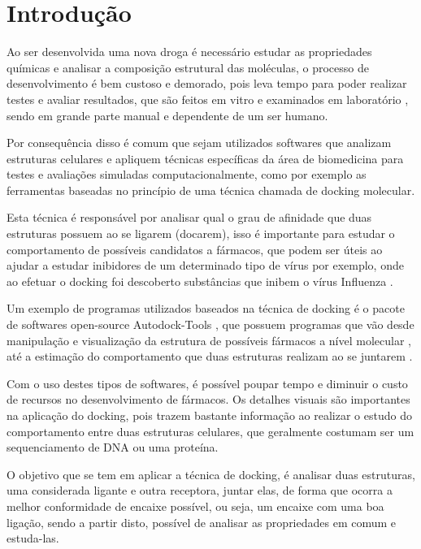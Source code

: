 \documentclass[tcc, capa]{texucpel}
\begin{document}
\tableofcontents

\chapter{Introdução}

Ao ser desenvolvida uma nova droga é necessário estudar as propriedades químicas e analisar a composição estrutural das moléculas, o processo de desenvolvimento é bem custoso e demorado, pois leva tempo para poder realizar testes e avaliar resultados, que são feitos em vitro e examinados em laboratório \cite{prnasciutti2012}, sendo em grande parte manual e dependente de um ser humano.

Por consequência disso é comum que sejam utilizados softwares que analizam estruturas celulares e apliquem técnicas específicas da área de biomedicina para testes e avaliações simuladas computacionalmente, como por exemplo as ferramentas baseadas no princípio de uma técnica chamada de docking molecular.

Esta técnica é responsável por analisar qual o grau de afinidade que duas estruturas possuem ao se ligarem (docarem), isso é importante para estudar o comportamento de possíveis candidatos a fármacos, que podem ser  úteis ao ajudar a estudar inibidores de um determinado tipo de vírus por exemplo,  onde ao efetuar o docking foi descoberto substâncias que inibem o vírus Influenza \cite{ishikawa2011binding}.

Um exemplo de programas utilizados baseados na técnica de docking é o pacote de softwares open-source Autodock-Tools \cite{autodocktools}, que possuem programas que vão desde manipulação e visualização da estrutura de possíveis fármacos a nível molecular , até a estimação do comportamento que duas estruturas realizam ao se juntarem \cite{trott2010autodock}.

Com o uso destes tipos de softwares, é possível poupar tempo e diminuir o custo de recursos no desenvolvimento de fármacos.
Os detalhes visuais são importantes na aplicação do docking, pois trazem bastante informação ao realizar o estudo do comportamento entre duas estruturas celulares, que geralmente costumam ser um sequenciamento de DNA ou uma proteína.

O objetivo que se tem em aplicar a técnica de docking, é analisar duas estruturas, uma considerada ligante e outra receptora, juntar elas, de forma que ocorra a melhor conformidade de encaixe possível, ou seja, um encaixe com uma boa ligação, sendo a partir disto, possível de analisar as propriedades em comum e estuda-las.
\end{document}
